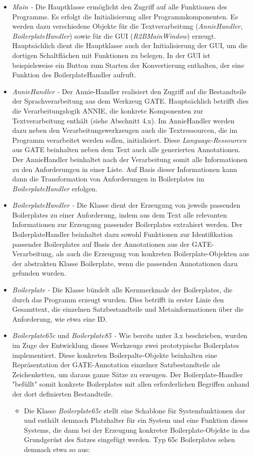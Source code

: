 \documentclass[12pt]{report}
\begin{document}
\begin{itemize}
\item \textit{Main -} Die Hauptklasse ermöglicht den Zugriff auf alle Funktionen des Programms. Es erfolgt die Initialisierung aller Programmkomponenten. Es werden dazu verschiedene Objekte für die Textverarbeitung (\textit{AnnieHandler}, \textit{BoilerplateHandler}) sowie für die GUI (\textit{R2BMainWindow}) erzeugt. Hauptsächlich dient die Hauptklasse auch der Initialisierung der GUI, um die dortigen Schaltflächen mit Funktionen zu belegen. In der GUI ist beispielsweise ein Button zum Starten der Konvertierung enthalten, der eine Funktion des BoilerplateHandler aufruft. 
\item \textit{AnnieHandler -} Der Annie-Handler realisiert den Zugriff auf die Bestandteile der Sprachverarbeitung aus dem Werkzeug GATE. Hauptsächlich betrifft dies die Verarbeitungslogik ANNIE, die konkrete Komponenten zur Textverarbeitung enthält (siehe Abschnitt 4.x). Im AnnieHandler werden dazu neben den Verarbeitungswerkzeugen auch die Textressourcen, die im Programm verarbeitet werden sollen, initialisiert. Diese \textit{Language-Ressourcen} aus GATE beinhalten neben dem Text auch alle generierten Annotationen. Der AnnieHandler beinhaltet nach der Verarbeitung somit alle Informationen zu den Anforderungen in einer Liste. Auf Basis dieser Informationen kann dann die Transformation von Anforderungen in Boilerplates im \textit{BoilerplateHandler} erfolgen.
\item \textit{BoilerplateHandler -} Die Klasse dient der Erzeugung von jeweils passenden Boilerplates zu einer Anforderung, indem aus dem Text alle relevanten Informationen zur Erzeugung passender Boilerplates extrahiert werden. Der BoilerplateHandler beinhaltet dazu sowohl Funktionen zur Identifikation passender Boilerplates auf Basis der Annotationen aus der GATE-Verarbeitung, als auch die Erzeugung von konkreten Boilerplate-Objekten aus der abstrakten Klasse Boilerplate, wenn die passenden Annotationen dazu gefunden wurden.
\item \textit{Boilerplate -} Die Klasse bündelt alle Kernmerkmale der Boilerplates, die durch das Programm erzeugt wurden. Dies betrifft in erster Linie den Gesamttext, die einzelnen Satzbestandteile und Metainformationen über die Anforderung, wie etwa eine ID.
\item \textit{Boilerplate65c} und \textit{Boilerplate85 -} Wie bereits unter 3.x beschrieben, wurden im Zuge der Entwicklung dieses Werkzeugs zwei prototypische Boilerplates implementiert. Diese konkreten Boilerpalte-Objekte beinhalten eine Repräsentation der GATE-Annotation einzelner Satzbestandteile als Zeichenketten, um daraus ganze Sätze zu erzeugen. Der Boilerplate-Handler "befüllt" somit konkrete Boilerplates mit allen erforderlichen Begriffen anhand der dort definierten Bestandteile.
\begin{itemize}
\item Die Klasse \textit{Boilerplate65c} stellt eine Schablone für Systemfunktionen dar und enthält demnach Platzhalter für ein System und eine Funktion dieses Systems, die dann bei der Erzeugung konkreter Boilerplate-Objekte in das Grundgerüst des Satzes eingefügt werden. Typ 65c Boilerplates sehen demnach etwa so aus: 


\end{itemize}
\end{itemize}
\end{document}
